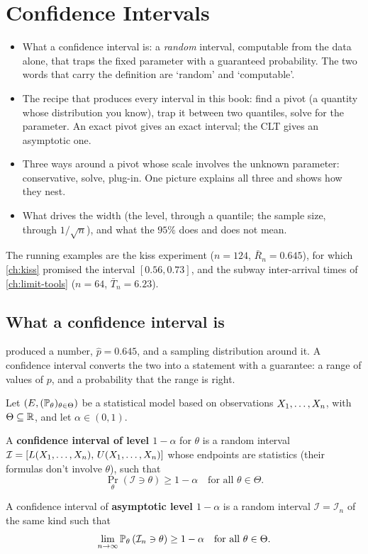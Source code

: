 \chapter{Confidence Intervals}
\label{ch:confidence-intervals}

\begin{chaptergoals}
\begin{itemize}[nosep]
\item What a confidence interval is: a \textit{random} interval, computable from the data alone, that traps the fixed parameter with a guaranteed probability. The two words that carry the definition are `random' and `computable'.
\item The recipe that produces every interval in this book: find a pivot (a quantity whose distribution you know), trap it between two quantiles, solve for the parameter. An exact pivot gives an exact interval; the CLT gives an asymptotic one.
\item Three ways around a pivot whose scale involves the unknown parameter: conservative, solve, plug-in. One picture explains all three and shows how they nest.
\item What drives the width (the level, through a quantile; the sample size, through $1/\sqrt{n}$), and what the $95\%$ does and does not mean.
\end{itemize}
The running examples are the kiss experiment ($n = 124$, $\bar{R}_n = 0.645$), for which \cref{ch:kiss} promised the interval $[0.56, 0.73]$, and the subway inter-arrival times of \cref{ch:limit-tools} ($n = 64$, $\bar{T}_n = 6.23$).
\end{chaptergoals}

\section{What a confidence interval is}
\label{sec:ci-definition}

 produced a number, $\hat{p} = 0.645$, and a sampling distribution around it.
A confidence interval converts the two into a statement with a guarantee: a range of values of $p$, and a probability that the range is right.

\begin{definition}
\label{def:ci}
Let $(E, (\mathbb{P}_{\theta})_{\theta \in \Theta})$ be a statistical model based on observations $X_1, \ldots, X_n$, with $\Theta \subseteq \mathbb{R}$, and let $\alpha \in (0,1)$.

A \textbf{confidence interval of level $1 - \alpha$} for $\theta$ is a random interval $\mathcal{I} = [L(X_1, \ldots, X_n), \, U(X_1, \ldots, X_n)]$ whose endpoints are statistics (their formulas don't involve $\theta$), such that
\[
\Pr_\theta \left( \mathcal{I} \ni \theta \right) \geq 1 - \alpha \quad \text{for all } \theta \in \Theta.
\]

A confidence interval of \textbf{asymptotic level $1 - \alpha$} is a random interval $\mathcal{I} = \mathcal{I}_n$ of the same kind such that
\[
\lim_{n \to \infty} \mathbb{P}_\theta \left( \mathcal{I}_n \ni \theta \right) \geq 1 - \alpha \quad \text{for all } \theta \in \Theta.
\]
\end{definition}


